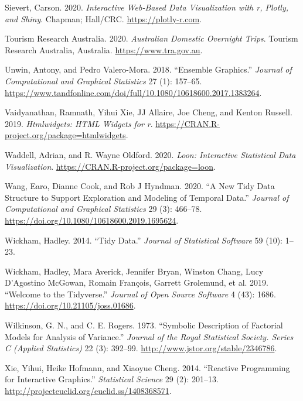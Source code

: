 \begin{CSLReferences}{1}{0}
\leavevmode{}%
Sievert, Carson. 2020. \emph{Interactive Web-Based Data Visualization with r, Plotly, and Shiny}. Chapman; Hall/CRC. \url{https://plotly-r.com}.

\leavevmode{}%
Tourism Research Australia. 2020. \emph{Australian Domestic Overnight Trips}. Tourism Research Australia, Australia. \url{https://www.tra.gov.au}.

\leavevmode{}%
Unwin, Antony, and Pedro Valero-Mora. 2018. {``Ensemble {Graphics}.''} \emph{Journal of Computational and Graphical Statistics} 27 (1): 157--65. \url{https://www.tandfonline.com/doi/full/10.1080/10618600.2017.1383264}.

\leavevmode{}%
Vaidyanathan, Ramnath, Yihui Xie, JJ Allaire, Joe Cheng, and Kenton Russell. 2019. \emph{Htmlwidgets: HTML Widgets for r}. \url{https://CRAN.R-project.org/package=htmlwidgets}.

\leavevmode{}%
Waddell, Adrian, and R. Wayne Oldford. 2020. \emph{Loon: Interactive Statistical Data Visualization}. \url{https://CRAN.R-project.org/package=loon}.

\leavevmode{}%
Wang, Earo, Dianne Cook, and Rob J Hyndman. 2020. {``A New Tidy Data Structure to Support Exploration and Modeling of Temporal Data.''} \emph{Journal of Computational and Graphical Statistics} 29 (3): 466--78. \url{https://doi.org/10.1080/10618600.2019.1695624}.

\leavevmode{}%
Wickham, Hadley. 2014. {``Tidy Data.''} \emph{Journal of Statistical Software} 59 (10): 1--23.

\leavevmode{}%
Wickham, Hadley, Mara Averick, Jennifer Bryan, Winston Chang, Lucy D'Agostino McGowan, Romain François, Garrett Grolemund, et al. 2019. {``Welcome to the Tidyverse.''} \emph{Journal of Open Source Software} 4 (43): 1686. \url{https://doi.org/10.21105/joss.01686}.

\leavevmode{}%
Wilkinson, G. N., and C. E. Rogers. 1973. {``Symbolic Description of Factorial Models for Analysis of Variance.''} \emph{Journal of the Royal Statistical Society. Series C (Applied Statistics)} 22 (3): 392--99. \url{http://www.jstor.org/stable/2346786}.

\leavevmode{}%
Xie, Yihui, Heike Hofmann, and Xiaoyue Cheng. 2014. {``Reactive Programming for Interactive Graphics.''} \emph{Statistical Science} 29 (2): 201--13. \url{http://projecteuclid.org/euclid.ss/1408368571}.

\end{CSLReferences}

